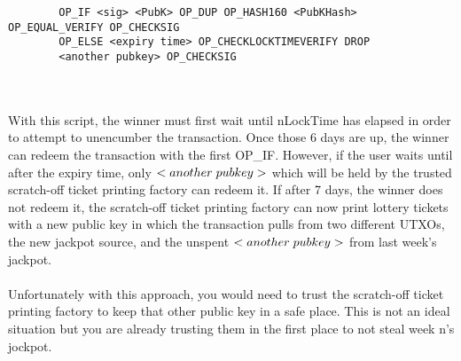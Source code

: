 \documentclass[11pt]{article}
\begin{document}
\begin{enumerate}
\begin{enumerate}
        \begin{verbatim}
        OP_IF <sig> <PubK> OP_DUP OP_HASH160 <PubKHash> OP_EQUAL_VERIFY OP_CHECKSIG
        OP_ELSE <expiry time> OP_CHECKLOCKTIMEVERIFY DROP
        <another pubkey> OP_CHECKSIG
        \end{verbatim}
        
        \\\\ With this script, the winner must first wait until nLockTime has elapsed in order to attempt to unencumber the transaction. Once those 6 days are up, the winner can redeem the transaction with the first OP\_IF. However, if the user waits until after the expiry time, only $<another\hspace{1mm}pubkey>$ which will be held by the trusted scratch-off ticket printing factory can redeem it. If after 7 days, the winner does not redeem it, the scratch-off ticket printing factory can now print lottery tickets with a new public key in which the transaction pulls from two different UTXOs, the new jackpot source, and the unspent $<another\hspace{1mm}pubkey>$ from last week's jackpot.
        \\\\ Unfortunately with this approach, you would need to trust the scratch-off ticket printing factory to keep that other public key in a safe place. This is not an ideal situation but you are already trusting them in the first place to not steal week n's jockpot.
    \end{enumerate}

\end{enumerate}
\end{document}
